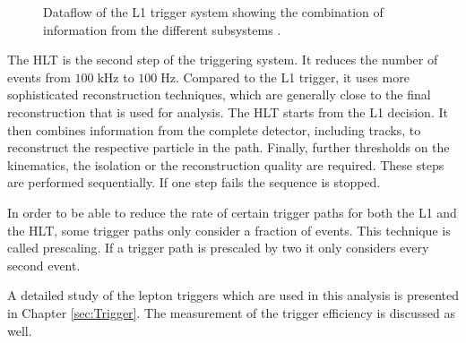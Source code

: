 \begin{figure}[htbp!]
  \begin{center}

\caption{ Dataflow of the L1 trigger system showing the combination of information from the different subsystems \cite{Tapper:2013yva}.
  \label{fig:det_Trigger}}
  \end{center}
\end{figure}

The HLT is the second step of the triggering system. It reduces the number of events from $100 \; \si{\kilo \hertz}$ to $100 \; \si{\hertz}$.
Compared to the L1 trigger, it uses more sophisticated reconstruction techniques, which are generally close to the final reconstruction that is used for analysis.
The HLT starts from the L1 decision. It then combines information from the complete detector, including tracks, to reconstruct the respective particle in the path.
Finally, further thresholds on the kinematics, the isolation or the reconstruction quality are required. 
These steps are performed sequentially. If one step fails the sequence is stopped. 

In order to be able to reduce the rate of certain trigger paths for both the L1 and the HLT, some trigger paths only consider a fraction of events. This technique is called prescaling. If a trigger path is prescaled by two it only considers every second event.

A detailed study of the lepton triggers which are used in this analysis is presented in Chapter \ref{sec:Trigger}. The measurement of the trigger efficiency is 
discussed as well.

